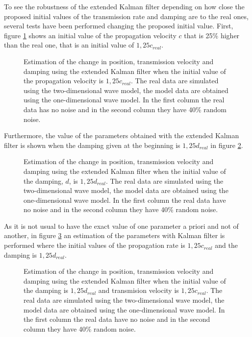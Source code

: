 \documentclass[12pt, a4paper]{article} %
\begin{document}
To see the robustness of the extended Kalman filter depending on how close the proposed initial values of the transmission rate and damping are to the real ones, several tests have been performed changing the proposed initial value.  
First, figure \ref{fig:kalman1c} shows an initial value of the propagation velocity $c$ that is 25\% higher than the real one, that is an initial value of $1,25 c_{real}$.

\begin{figure}[h!]
    \centering
    
    \caption{Estimation of the change in position, transmission velocity and damping using the extended Kalman filter when the initial value of the propagation velocity is $1,25 c_{real}$. The real data are simulated using the two-dimensional wave model, the model data are obtained using the one-dimensional wave model. In the first column the real data has no noise and in the second column they have 40\% random noise.}
    \label{fig:kalman1c}
\end{figure}

Furthermore, the value of the parameters obtained with the extended Kalman filter is shown when the damping given at the beginning is $1,25 d_{real}$ in figure \ref{fig:kalman1d}.

\begin{figure}[h!]
    \centering
    
    \caption{Estimation of the change in position, transmission velocity and damping using the extended Kalman filter when the initial value of the damping, $d$, is $ 1,25 d_{real}$. The real data are simulated using the two-dimensional wave model, the model data are obtained using the one-dimensional wave model. In the first column the real data have no noise and in the second column they have 40\% random noise.}
    \label{fig:kalman1d}
\end{figure}

\newpage

As it is not usual to have the exact value of one parameter a priori and not of another, in figure \ref{fig:kalman1dc} an estimation of the parameters with Kalman filter is performed where the initial values of the propagation rate is $1,25 c_{real}$ and the damping is $1,25 d_{real}$.

\newpage

\begin{figure}[h!]
    \centering
    
    \caption{Estimation of the change in position, transmission velocity and damping using the extended Kalman filter when the initial value of the damping is $1,25 d_{real}$ and transmision velocity is $1,25 c_{real}$. The real data are simulated using the two-dimensional wave model, the model data are obtained using the one-dimensional wave model. In the first column the real data have no noise and in the second column they have 40\% random noise.}
    \label{fig:kalman1dc}
\end{figure}
\end{document}
